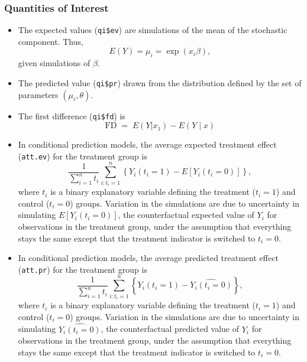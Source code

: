 \subsubsection{Quantities of Interest}
\begin{itemize}
\item The expected values ({\tt qi\$ev}) are simulations of the mean
  of the stochastic component.  Thus, $$E(Y) = \mu_i = \exp(x_i
  \beta),$$ given simulations of $\beta$.  
  
\item The predicted value ({\tt qi\$pr}) drawn from the distribution
  defined by the set of parameters $(\mu_i, \theta)$.

\item The first difference ({\tt qi\$fd}) is
\begin{equation*}
\textrm{FD} \; = \; E(Y | x_1) - E(Y \mid x)
\end{equation*}
\item In conditional prediction models, the average expected treatment
  effect ({\tt att.ev}) for the treatment group is 
    \begin{equation*} \frac{1}{\sum_{i=1}^n t_i}\sum_{i:t_i=1}^n \left\{ Y_i(t_i=1) -
      E[Y_i(t_i=0)] \right\},
    \end{equation*} 
    where $t_i$ is a binary explanatory variable defining the treatment
    ($t_i=1$) and control ($t_i=0$) groups.  Variation in the
    simulations are due to uncertainty in simulating $E[Y_i(t_i=0)]$,
    the counterfactual expected value of $Y_i$ for observations in the
    treatment group, under the assumption that everything stays the
    same except that the treatment indicator is switched to $t_i=0$.

\item In conditional prediction models, the average predicted treatment
  effect ({\tt att.pr}) for the treatment group is 
    \begin{equation*} \frac{1}{\sum_{i=1}^n t_i}\sum_{i:t_i=1}^n \left\{ Y_i(t_i=1) -
      \widehat{Y_i(t_i=0)} \right\},
    \end{equation*} 
    where $t_i$ is a binary explanatory variable defining the
    treatment ($t_i=1$) and control ($t_i=0$) groups.  Variation in
    the simulations are due to uncertainty in simulating
    $\widehat{Y_i(t_i=0)}$, the counterfactual predicted value of
    $Y_i$ for observations in the treatment group, under the
    assumption that everything stays the same except that the
    treatment indicator is switched to $t_i=0$.
\end{itemize}

